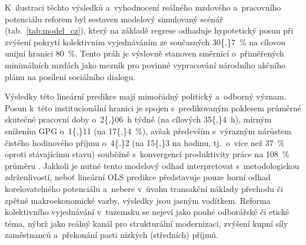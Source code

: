 K~ilustraci těchto výsledků a~vyhodnocení reálného mzdového a~pracovního potenciálu reforem byl sestaven modelový simulovaný scénář (tab.~\ref{tab:model_cz}), který na základě regrese odhaduje hypotetický posun  při zvýšení pokrytí kolektivním vyjednáváním ze současných \SI{30{,}7}{\percent} na cílovou unijní hranici \SI{80}{\percent}. Tento práh je výslovně stanoven směrnicí o~přiměřených minimálních mzdách jako mezník pro povinné vypracování národního akčního plánu na posílení sociálního dialogu.\par



Výsledky této lineární predikce mají mimořádný politický a~odborný význam. Posun  k~této institucionální hranici je spojen s~predikovaným poklesem průměrné skutečné pracovní doby o~\SI{2{,}06}{\hour} týdně (na cílových \SI{35{,}4}{\hour}), mírným snížením \acs{GPG} o~\SI{1{,}11}{\pp} (na \SI{17{,}4}{\percent}), avšak především s~výrazným nárůstem čistého hodinového příjmu o~\SI{4{,}2}{\pps} (na \SI{15{,}3}{\pps} na hodinu, tj.~o~více než \SI{37}{\percent} oproti stávajícímu stavu) souběžně s~konvergencí produktivity práce na \SI{108}{\percent} průměru . Jakkoli je nutné tento modelový odhad interpretovat s~metodologickou zdrženlivostí, neboť lineární OLS predikce představuje pouze horní odhad korelovatelného potenciálu a~nebere v~úvahu transakční náklady přechodu či zpětné makroekonomické vazby, výsledky jsou jasným vodítkem. Reforma kolektivního vyjednávání v~tuzemsku se nejeví jako pouhé odborářské či etické téma, nýbrž jako reálný kanál pro strukturální modernizaci, zvýšení kupní síly zaměstnanců a~překonání pasti nízkých (středních) příjmů.\par
